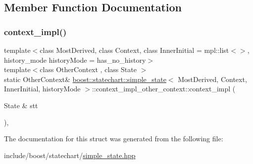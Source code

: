 \subsection{Member Function Documentation}
\mbox{\label{structboost_1_1statechart_1_1simple__state_1_1context__impl__other__context_aa266014585843224104f24cb0532d16f}} 
\subsubsection{\texorpdfstring{context\+\_\+impl()}{context\_impl()}}
{\footnotesize\ttfamily template$<$class Most\+Derived, class Context, class Inner\+Initial = mpl\+::list$<$$>$, history\+\_\+mode history\+Mode = has\+\_\+no\+\_\+history$>$ \\
template$<$class Other\+Context , class State $>$ \\
static Other\+Context\& \mbox{\hyperlink{classboost_1_1statechart_1_1simple__state}{boost\+::statechart\+::simple\+\_\+state}}$<$ Most\+Derived, Context, Inner\+Initial, history\+Mode $>$\+::context\+\_\+impl\+\_\+other\+\_\+context\+::context\+\_\+impl (\begin{DoxyParamCaption}\item[{State \&}]{stt }\end{DoxyParamCaption})\hspace{0.3cm}{\ttfamily [inline]}, {\ttfamily [static]}}



The documentation for this struct was generated from the following file\+:\begin{DoxyCompactItemize}
\item 
include/boost/statechart/\mbox{\hyperlink{simple__state_8hpp}{simple\+\_\+state.\+hpp}}\end{DoxyCompactItemize}
